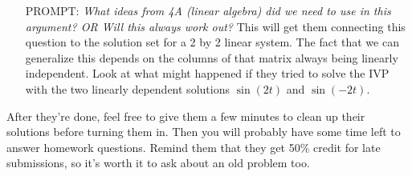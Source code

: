 \documentclass[epsf]{article}
\begin{document}
\begin{itemize}
\item[PROMPT:]\textit{What ideas from 4A (linear algebra) did we need to use in this argument?  OR Will this always work out?}  This will get them connecting this question to the solution set for a 2 by 2 linear system.  The fact that we can generalize this depends on the columns of that matrix always being linearly independent.  Look at what might happened if they tried to solve the IVP with the two linearly dependent solutions $\sin(2t)$ and $\sin(-2t)$.
\end{itemize}

After they're done, feel free to give them a few minutes to clean up their solutions before turning them in.  Then you will probably have some time left to answer homework questions.  Remind them that they get 50\% credit for late submissions, so it's worth it to ask about an old problem too.
\end{document}
